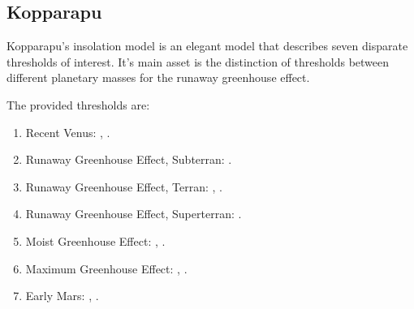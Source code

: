 \documentclass[letterpaper,10pt,english]{sphinxmanual}
\begin{document}
\subsection{Kopparapu}
\label{\detokenize{quantities/insolation_models/kopparapu/kopparapu:kopparapu}}\label{\detokenize{quantities/insolation_models/kopparapu/kopparapu::doc}}\label{\detokenize{quantities/insolation_models/kopparapu/kopparapu:kopparapu-insolation-model}}
\sphinxAtStartPar
Kopparapu’s insolation model is an elegant model that describes seven
disparate thresholds of interest.
It’s main asset is the distinction of thresholds between different planetary
masses for the runaway greenhouse effect.

\sphinxAtStartPar
The provided thresholds are:
\begin{enumerate}
%
\item {} 
\sphinxAtStartPar
Recent Venus: , {\hyperref[\detokenize{quantities/insolation_models/relaxed_minimum_limit:id1}]{}}.

\item {} 
\sphinxAtStartPar
Runaway Greenhouse Effect, Subterran: .

\item {} 
\sphinxAtStartPar
Runaway Greenhouse Effect, Terran: , {\hyperref[\detokenize{quantities/insolation_models/conservative_minimum_limit:id1}]{}}.

\item {} 
\sphinxAtStartPar
Runaway Greenhouse Effect, Superterran: .

\item {} 
\sphinxAtStartPar
Moist Greenhouse Effect: , {\hyperref[\detokenize{quantities/insolation_models/earth_equivalent_limit:id1}]{}}.

\item {} 
\sphinxAtStartPar
Maximum Greenhouse Effect: , {\hyperref[\detokenize{quantities/insolation_models/conservative_maximum_limit:id1}]{}}.

\item {} 
\sphinxAtStartPar
Early Mars: , {\hyperref[\detokenize{quantities/insolation_models/relaxed_maximum_limit:id1}]{}}.

\end{enumerate}
\end{document}
